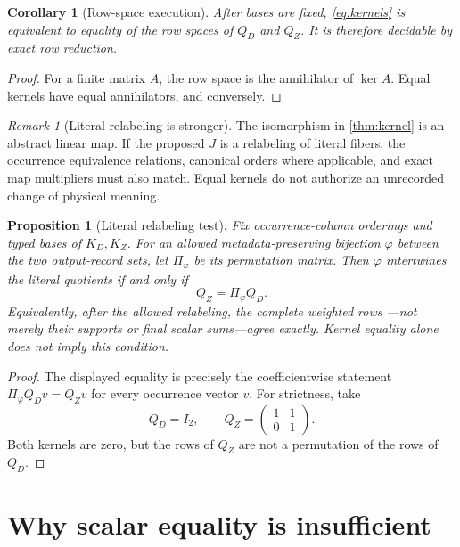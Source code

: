 \documentclass[11pt]{article}
\newtheorem{proposition}[theorem]{Proposition}
\newtheorem{corollary}[theorem]{Corollary}
\theoremstyle{definition}
\theoremstyle{remark}
\newtheorem{remark}[theorem]{Remark}
\begin{document}
\begin{corollary}[Row-space execution]
\label{cor:rowspace}
After bases are fixed, \eqref{eq:kernels} is equivalent to equality
of the row spaces of \(Q_D\) and \(Q_Z\).  It is therefore decidable
by exact row reduction.
\end{corollary}

\begin{proof}
For a finite matrix \(A\), the row space is the annihilator of
\(\ker A\).  Equal kernels have equal annihilators, and conversely.
\end{proof}

\begin{remark}[Literal relabeling is stronger]
The isomorphism in \cref{thm:kernel} is an abstract linear map.  If
the proposed \(J\) is a relabeling of literal fibers, the occurrence
equivalence relations, canonical orders where applicable, and exact
map multipliers must also match.  Equal kernels do not authorize an
unrecorded change of physical meaning.
\end{remark}

\begin{proposition}[Literal relabeling test]
\label{prop:literal-relabel}
Fix occurrence-column orderings and typed bases of \(K_D,K_Z\).
For an allowed metadata-preserving bijection \(\varphi\) between the
two output-record sets, let \(\Pi_\varphi\) be its permutation matrix.
Then \(\varphi\) intertwines the literal quotients if and only if
\[
 Q_Z=\Pi_\varphi Q_D.
\]
Equivalently, after the allowed relabeling, the complete weighted rows
---not merely their supports or final scalar sums---agree exactly.
Kernel equality alone does not imply this condition.
\end{proposition}

\begin{proof}
The displayed equality is precisely the coefficientwise statement
\(\Pi_\varphi Q_Dv=Q_Zv\) for every occurrence vector \(v\).
For strictness, take
\[
 Q_D=I_2,\qquad
 Q_Z=\begin{pmatrix}1&1\\0&1\end{pmatrix}.
\]
Both kernels are zero, but the rows of \(Q_Z\) are not a permutation
of the rows of \(Q_D\).
\end{proof}

\section{Why scalar equality is insufficient}
\end{document}
